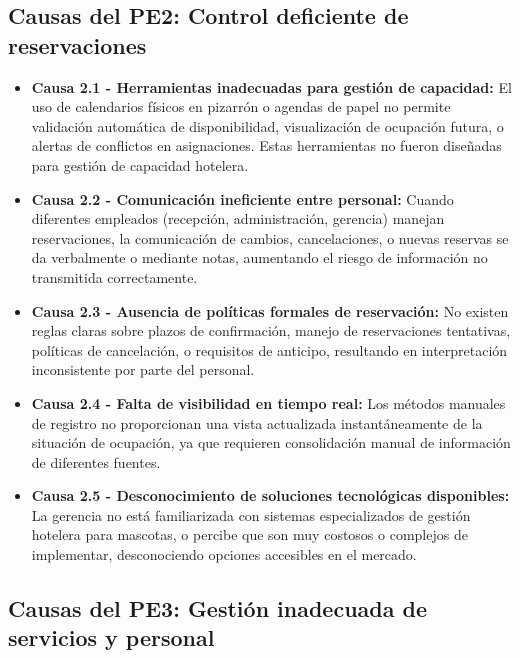 \subsection{Causas del PE2: Control deficiente de reservaciones}
\label{sec:causas2}

	\begin{itemize}
		\item \textbf{Causa 2.1 - Herramientas inadecuadas para gestión de capacidad:} El uso de calendarios físicos en pizarrón o agendas de papel no permite validación automática de disponibilidad, visualización de ocupación futura, o alertas de conflictos en asignaciones. Estas herramientas no fueron diseñadas para gestión de capacidad hotelera.
		
		\item \textbf{Causa 2.2 - Comunicación ineficiente entre personal:} Cuando diferentes empleados (recepción, administración, gerencia) manejan reservaciones, la comunicación de cambios, cancelaciones, o nuevas reservas se da verbalmente o mediante notas, aumentando el riesgo de información no transmitida correctamente.
		
		\item \textbf{Causa 2.3 - Ausencia de políticas formales de reservación:} No existen reglas claras sobre plazos de confirmación, manejo de reservaciones tentativas, políticas de cancelación, o requisitos de anticipo, resultando en interpretación inconsistente por parte del personal.
		
		\item \textbf{Causa 2.4 - Falta de visibilidad en tiempo real:} Los métodos manuales de registro no proporcionan una vista actualizada instantáneamente de la situación de ocupación, ya que requieren consolidación manual de información de diferentes fuentes.
		
		\item \textbf{Causa 2.5 - Desconocimiento de soluciones tecnológicas disponibles:} La gerencia no está familiarizada con sistemas especializados de gestión hotelera para mascotas, o percibe que son muy costosos o complejos de implementar, desconociendo opciones accesibles en el mercado.
	\end{itemize}

\subsection{Causas del PE3: Gestión inadecuada de servicios y personal}
\label{sec:causas3}

